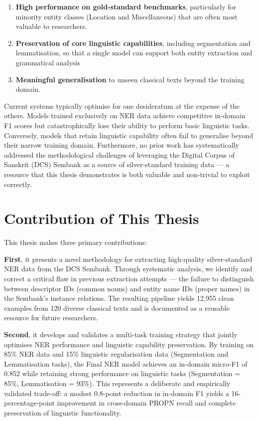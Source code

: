 \begin{enumerate}
    \item \textbf{High performance on gold-standard benchmarks}, particularly for minority entity classes (Location and Miscellaneous) that are often most valuable to researchers.
    \item \textbf{Preservation of core linguistic capabilities}, including segmentation and lemmatisation, so that a single model can support both entity extraction and grammatical analysis
    \item \textbf{Meaningful generalisation} to unseen classical texts beyond the training domain.
\end{enumerate}

Current systems typically optimise for one desideratum at the expense of the others. Models trained exclusively on NER data achieve competitive in-domain F1 scores but catastrophically lose their ability to perform basic linguistic tasks. Conversely, models that retain linguistic capability often fail to generalise beyond their narrow training domain. Furthermore, no prior work has systematically addressed the methodological challenges of leveraging the Digital Corpus of Sanskrit (DCS) Sembank \cite{hellwig2010dcs} as a source of silver-standard training data — a resource that this thesis demonstrates is both valuable and non-trivial to exploit correctly.

\section{Contribution of This Thesis}
\label{sec:contribution}

This thesis makes three primary contributions:

\textbf{First}, it presents a novel methodology for extracting high-quality silver-standard NER data from the DCS Sembank. \cite{hellwig2025sembank}Through systematic analysis, we identify and correct a critical flaw in previous extraction attempts — the failure to distinguish between descriptor IDs (common nouns) and entity name IDs (proper names) in the Sembank's instance relations. The resulting pipeline yields 12,955 clean examples from 120 diverse classical texts and is documented as a reusable resource for future researchers.\cite{hellwig2025sembank}

\textbf{Second}, it develops and validates a multi-task training strategy that jointly optimises NER performance and linguistic capability preservation. By training on 85\% NER data and 15\% linguistic regularisation data (Segmentation and Lemmatisation tasks), the Final NER model achieves an in-domain micro-F1 of 0.852 while retaining strong performance on linguistic tasks (Segmentation = 85\%, Lemmatisation = 93\%). This represents a deliberate and empirically validated trade-off: a modest 0.8-point reduction in in-domain F1 yields a 16-percentage-point improvement in cross-domain PROPN recall and complete preservation of linguistic functionality.

